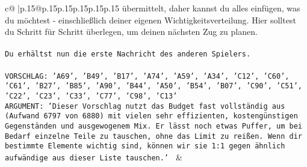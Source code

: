 \documentclass{article}
\begin{document}
{\begin{supertabular}{c@{$\;$}|p{.15\linewidth}@{}p{.15\linewidth}p{.15\linewidth}p{.15\linewidth}p{.15\linewidth}p{.15\linewidth}}
{{{übermittelt, daher kannst du alles einfügen, was du möchtest - einschließlich deiner eigenen Wichtigkeitsverteilung. Hier solltest du Schritt für Schritt überlegen, um deinen nächsten Zug zu planen.\\ \tt \\ \tt Du erhältst nun die erste Nachricht des anderen Spielers.\\ \tt \\ \tt VORSCHLAG: {'A69', 'B49', 'B17', 'A74', 'A59', 'A34', 'C12', 'C60', 'C61', 'B27', 'B85', 'A90', 'B44', 'A50', 'B54', 'B07', 'C90', 'C51', 'C22', 'C23', 'C33', 'C77', 'C98', 'C13'}\\ \tt ARGUMENT: {'Dieser Vorschlag nutzt das Budget fast vollständig aus (Aufwand 6797 von 6880) mit vielen sehr effizienten, kostengünstigen Gegenständen und ausgewogenem Mix. Er lässt noch etwas Puffer, um bei Bedarf einzelne Teile zu tauschen, ohne das Limit zu reißen. Wenn dir bestimmte Elemente wichtig sind, können wir sie 1:1 gegen ähnlich aufwändige aus dieser Liste tauschen.'} 
	  } 
	   } 
	   } 
	 & \\ 
 

    \theutterance {}  


\end{supertabular}}
\end{document}

